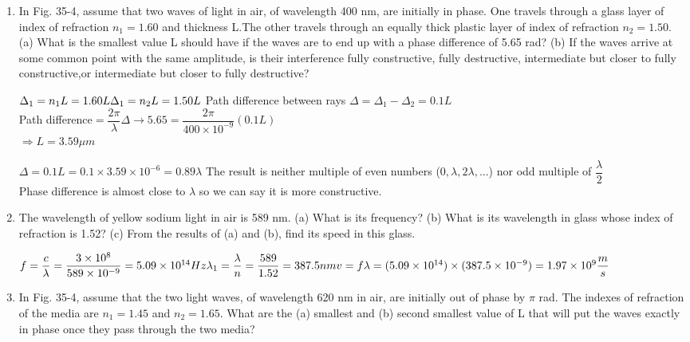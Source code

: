 \documentclass[fleqn]{article}
\begin{document}
  \begin{enumerate}
    \item In Fig. 35-4, assume that two waves of light in air, of wavelength 400 nm, are initially in phase. One travels through a glass layer of index of refraction $n_1=1.60$ and thickness L.The other travels through an equally thick plastic layer of index of refraction $n_2=1.50$. (a) What is the smallest value L should have if the waves are to end up with a phase difference of 5.65 rad? (b) If the waves arrive at some common point with the same amplitude, is their interference fully constructive, fully destructive, intermediate but closer to fully constructive,or intermediate but closer to fully destructive?
    
    \textcolor{hwColor}{
      $
        \Delta_1=n_1L=1.60L \\
        \Delta_1=n_2L=1.50L \\
      $
      Path difference between rays $\Delta=\Delta_1-\Delta_2=0.1L$ \\
      Path difference$=\dfrac{2\pi}{\lambda}\Delta \longrightarrow 5.65=\dfrac{2\pi}{400\times10^{-9}}(0.1L)$ \\
      $
        \Longrightarrow L=3.59 \mu m
      $ \\
    }

    \textcolor{hwColor}{
      $
        \Delta=0.1L=0.1 \times 3.59 \times 10^{-6}=0.89 \lambda
      $
      The result is neither multiple of even numbers ($0, \lambda,2\lambda,...$) nor odd multiple of $\dfrac{\lambda}{2}$ \\
      Phase difference is almost close to $\lambda $ so we can say it is more constructive. 
    }
    
    \item The wavelength of yellow sodium light in air is 589 nm. (a) What is its frequency? (b) What is its wavelength in glass whose index of refraction is 1.52? (c) From the results of (a) and (b), find its speed in this glass.

    \textcolor{hwColor}{
      $
        f=\dfrac{c}{\lambda}=\dfrac{3 \times 10^8}{589 \times 10^{-9}}=5.09\times10^{14} Hz \\
        \lambda_1=\dfrac{\lambda}{n}=\dfrac{589}{1.52}=387.5 nm \\
        v=f\lambda=(5.09\times10^{14})\times(387.5\times10^{-9})=1.97\times10^9 \dfrac{m}{s}
      $
    }

    \item In Fig. 35-4, assume that the two light waves, of wavelength 620 nm in air, are initially out of phase by $\pi$ rad. The indexes of refraction of the media are $n_1=1.45$ and $n_2=1.65$. What are the (a) smallest and (b) second smallest value of L that will put the waves exactly in phase once they pass through the two media?


\end{enumerate}
\end{document}
